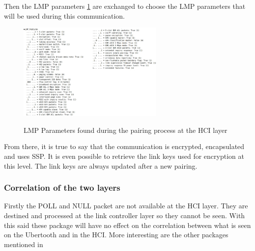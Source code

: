 Then the LMP parameters \ref{fig:lmp} are exchanged to choose the LMP parameters that will be used during this communication. 
\begin{figure}[!h]
  \begin{center}
	\includegraphics[width=270px]{images/LMP_PARAM.jpg}
	\label{fig:lmp}
	\caption{LMP Parameters found during the pairing process at the HCI layer}
  \end{center}
\end{figure}

From there, it is true to say that the communication is encrypted, encapsulated and uses SSP. It is even possible to retrieve the link keys used for encryption at this level. The link keys are always updated after a new pairing.

\subsubsection{Correlation of the two layers}

Firstly the POLL and NULL packet are not available at the HCI layer. They are destined and processed at the link controller layer so they cannot be seen. With this said these package will have no effect on the correlation between what is seen on the Ubertooth and in the HCI. More interesting are the other packages mentioned in 

